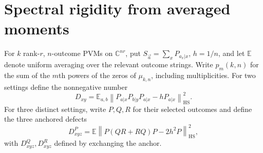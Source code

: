 \documentclass[11pt]{article}
\begin{document}
\section{Spectral rigidity from averaged moments}
\label{sec:spectralrigidity}
For $k$ rank-$r$, $n$-outcome PVMs on $\mathbb C^{nr}$, put
$S_{\vec a}=\sum_x P_{a_x|x}$, $h=1/n$, and let $\mathbb E$ denote uniform
averaging over the relevant outcome strings. Write $p_m(k,n)$ for the
sum of the $m$th powers of the zeros of $\mu_{k,n}$, including multiplicities.
For two settings define the nonnegative number
\[
 D_{xy}=\mathbb E_{a,b}\left\|P_{a|x}P_{b|y}P_{a|x}
                         -hP_{a|x}\right\|_{\mathrm{HS}}^2.
\]
For three distinct settings, write $P,Q,R$ for their selected outcomes and
define the three anchored defects
\[
 D_{xyz}^{P}=\mathbb E\left\|P(QR+RQ)P-2h^2P\right\|_{\mathrm{HS}}^2,
\]
with $D_{xyz}^{Q},D_{xyz}^{R}$ defined by exchanging the anchor.
\end{document}
